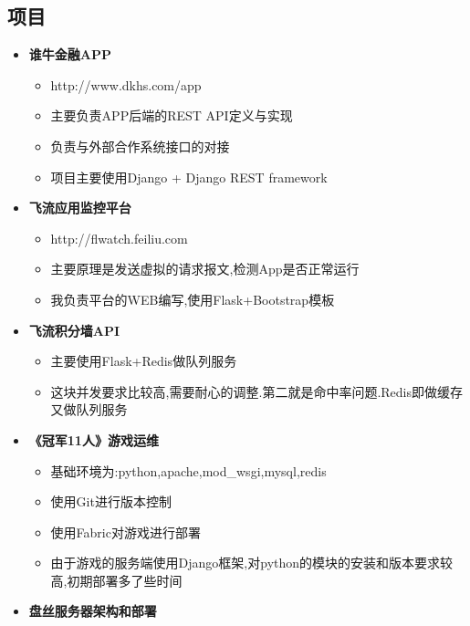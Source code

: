 \documentclass[11pt,letterpaper]{article}
\newcommand{\resitem}[1]{\item #1 \vspace{-2pt}}
\begin{document}
\begin{CJK}{UTF8}{gbsn}
\section{项目}  
       \begin{itemize}
		   \item{\textbf{谁牛金融APP}}\vspace{-6pt}
                       {\footnotesize
                       \begin{itemize}
							   \resitem{http://www.dkhs.com/app}
							   \resitem{主要负责APP后端的REST API定义与实现}
                               \resitem{负责与外部合作系统接口的对接}
                               \resitem{项目主要使用Django + Django REST framework}
                       \end{itemize}
                       } 
		   \item{\textbf{飞流应用监控平台}}\vspace{-6pt}
                       {\footnotesize
                       \begin{itemize}
							   \resitem{http://flwatch.feiliu.com}
							   \resitem{主要原理是发送虚拟的请求报文,检测App是否正常运行}
                               \resitem{我负责平台的WEB编写,使用Flask+Bootstrap模板}
                       \end{itemize}
                       } 
		   \item{\textbf{飞流积分墙API}}\vspace{-6pt}
                       {\footnotesize
                       \begin{itemize}
							   \resitem{主要使用Flask+Redis做队列服务}
                               \resitem{这块并发要求比较高,需要耐心的调整.第二就是命中率问题.Redis即做缓存又做队列服务}
                       \end{itemize}
                       } 
		   \item{\textbf{《冠军11人》游戏运维}}\vspace{-6pt}
                       {\footnotesize
                       \begin{itemize}
							   \resitem{基础环境为:python,apache,mod\_wsgi,mysql,redis}
							   \resitem{使用Git进行版本控制}
							   \resitem{使用Fabric对游戏进行部署}
                               \resitem{由于游戏的服务端使用Django框架,对python的模块的安装和版本要求较高,初期部署多了些时间}
                       \end{itemize}
                       } 
		   \item{\textbf{盘丝服务器架构和部署}}\vspace{-6pt}

\end{itemize}
\end{CJK}
\end{document}
